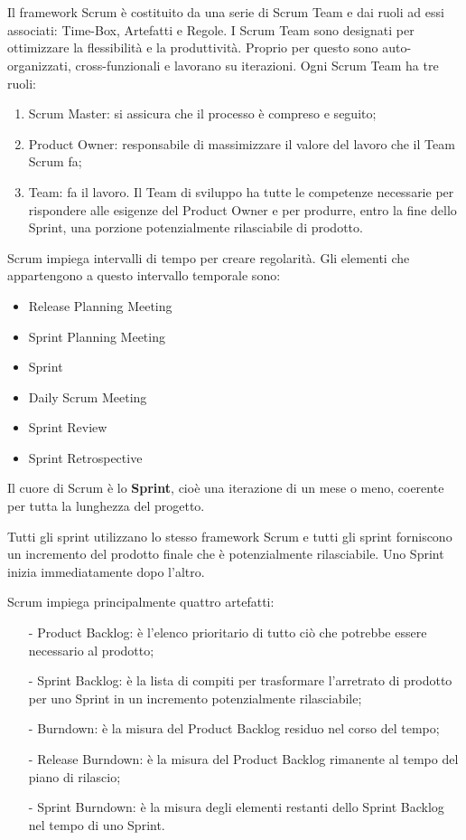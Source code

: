 \section*{\color{Blue}{LA SOSTANZA DI SCRUM}}
Il framework Scrum  \`e costituito da una serie  di
Scrum Team e dai ruoli ad essi associati: Time-Box, Artefatti e Regole.
I  Scrum Team sono  designati per  ottimizzare la  flessibilit\`a e  la produttivit\`a. Proprio per questo
sono auto-organizzati, cross-funzionali e lavorano su iterazioni.
Ogni Scrum Team ha tre ruoli: 

\begin{enumerate}
\item Scrum Master: si assicura che il processo \`e compreso e seguito;
\item Product Owner: responsabile di massimizzare il valore
del lavoro  che il  Team Scrum  fa; 
\item Team: fa  il lavoro. Il Team di
sviluppo ha  tutte le  competenze necessarie  per rispondere  alle esigenze  del
Product Owner e per  produrre, entro  la fine  dello Sprint, una
porzione potenzialmente rilasciabile di prodotto.
\end{enumerate}

Scrum impiega intervalli  di tempo per creare regolarit\`a.  Gli elementi che appartengono a questo intervallo temporale sono:
\begin{itemize}
\item Release  Planning  Meeting 
\item Sprint Planning  Meeting
\item Sprint
\item Daily Scrum Meeting
\item Sprint Review
\item Sprint Retrospective
\end{itemize}

Il cuore di Scrum \`e lo \textbf{Sprint}, cio\`e una iterazione di un mese o meno, coerente per
tutta la lunghezza del progetto.

Tutti gli sprint utilizzano  lo stesso framework Scrum  e tutti
gli sprint  forniscono un  incremento del  prodotto finale  che \`e potenzialmente
rilasciabile.  Uno  Sprint inizia  immediatamente  dopo l'altro.

Scrum  impiega principalmente quattro artefatti:\begin{itemize}
\item[-] Product Backlog: \`e l'elenco prioritario di tutto ci\`o che potrebbe essere necessario al prodotto;
\item[-] Sprint Backlog: \`e la lista di compiti per trasformare  l'arretrato di prodotto per uno Sprint in
un incremento  potenzialmente rilasciabile;
\item[-] Burndown: \`e la misura del Product Backlog residuo nel corso del tempo;
\item[-] Release Burndown: \`e la misura del Product Backlog rimanente  al tempo del piano di rilascio;
\item[-] Sprint Burndown: \`e la  misura degli elementi restanti dello Sprint Backlog
nel tempo  di uno  Sprint.
\end{itemize}

